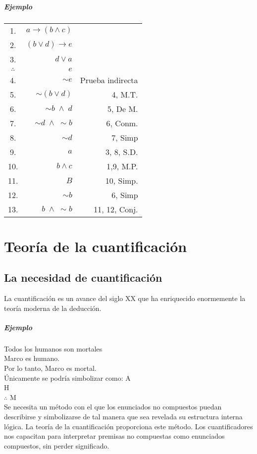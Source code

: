 \documentclass[10pt]{book} 						%
\begin{document}
\paragraph{Ejemplo}
\begin{center}
\begin{tabular}{c r r}
1.&$a \rightarrow (b\land c)$&\\
2.&$(b \lor d)\rightarrow e$&\\
3.&$d \lor a$&\\
$\therefore$&$e$&\\
4.&$\sim e$&Prueba indirecta\\
5.&$\sim(b \lor d)$&4, M.T.\\
6.&$\sim b \; \land \; d$&5, De M.\\
7.&$\sim d \; \land \; \sim b$&6, Conm.\\
8.&$\sim d$&7, Simp\\
9.&$a$&3, 8, S.D.\\
10.&$b \land c $&1,9, M.P.\\
11.&$B$&10, Simp.\\
12.&$\sim b$&6, Simp\\
13.&$b \; \land \; \sim b $&11, 12, Conj.\\
\end{tabular}
\end{center}

\chapter{Teoría de la cuantificación}
\section{La necesidad de cuantificación}
La cuantificación es un avance del siglo XX que ha enriquecido enormemente la teoría moderna de la deducción.\\
\paragraph{Ejemplo}
Todos los humanos son mortales\\
Marco es humano.\\
Por lo tanto, Marco es mortal.\\
Únicamente se podría simbolizar como: 
A\\
H\\
$\therefore$ M\\
Se necesita un método con el que los enunciados no compuestos puedan describirse y simbolizarse de tal manera que sea revelada su estructura interna lógica. La teoría de la cuantificación proporciona este método. Los cuantificadores nos capacitan para interpretar premisas no compuestas como enunciados compuestos, sin perder significado.
\end{document}
